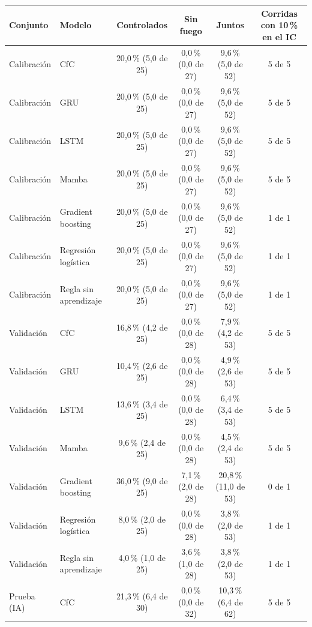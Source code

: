 \begin{tabular}{|l|l|c|c|c|c|}
\hline
\textbf{Conjunto} & \textbf{Modelo} & \textbf{Controlados} & \textbf{Sin fuego} & \textbf{Juntos} & \textbf{Corridas con 10\,\% en el IC} \\ \hline
Calibración & CfC & 20{,}0\,\% (5{,}0 de 25) & 0{,}0\,\% (0{,}0 de 27) & 9{,}6\,\% (5{,}0 de 52) & 5 de 5 \\ \hline
Calibración & GRU & 20{,}0\,\% (5{,}0 de 25) & 0{,}0\,\% (0{,}0 de 27) & 9{,}6\,\% (5{,}0 de 52) & 5 de 5 \\ \hline
Calibración & LSTM & 20{,}0\,\% (5{,}0 de 25) & 0{,}0\,\% (0{,}0 de 27) & 9{,}6\,\% (5{,}0 de 52) & 5 de 5 \\ \hline
Calibración & Mamba & 20{,}0\,\% (5{,}0 de 25) & 0{,}0\,\% (0{,}0 de 27) & 9{,}6\,\% (5{,}0 de 52) & 5 de 5 \\ \hline
Calibración & Gradient boosting & 20{,}0\,\% (5{,}0 de 25) & 0{,}0\,\% (0{,}0 de 27) & 9{,}6\,\% (5{,}0 de 52) & 1 de 1 \\ \hline
Calibración & Regresión logística & 20{,}0\,\% (5{,}0 de 25) & 0{,}0\,\% (0{,}0 de 27) & 9{,}6\,\% (5{,}0 de 52) & 1 de 1 \\ \hline
Calibración & Regla sin aprendizaje & 20{,}0\,\% (5{,}0 de 25) & 0{,}0\,\% (0{,}0 de 27) & 9{,}6\,\% (5{,}0 de 52) & 1 de 1 \\ \hline
Validación & CfC & 16{,}8\,\% (4{,}2 de 25) & 0{,}0\,\% (0{,}0 de 28) & 7{,}9\,\% (4{,}2 de 53) & 5 de 5 \\ \hline
Validación & GRU & 10{,}4\,\% (2{,}6 de 25) & 0{,}0\,\% (0{,}0 de 28) & 4{,}9\,\% (2{,}6 de 53) & 5 de 5 \\ \hline
Validación & LSTM & 13{,}6\,\% (3{,}4 de 25) & 0{,}0\,\% (0{,}0 de 28) & 6{,}4\,\% (3{,}4 de 53) & 5 de 5 \\ \hline
Validación & Mamba & 9{,}6\,\% (2{,}4 de 25) & 0{,}0\,\% (0{,}0 de 28) & 4{,}5\,\% (2{,}4 de 53) & 5 de 5 \\ \hline
Validación & Gradient boosting & 36{,}0\,\% (9{,}0 de 25) & 7{,}1\,\% (2{,}0 de 28) & 20{,}8\,\% (11{,}0 de 53) & 0 de 1 \\ \hline
Validación & Regresión logística & 8{,}0\,\% (2{,}0 de 25) & 0{,}0\,\% (0{,}0 de 28) & 3{,}8\,\% (2{,}0 de 53) & 1 de 1 \\ \hline
Validación & Regla sin aprendizaje & 4{,}0\,\% (1{,}0 de 25) & 3{,}6\,\% (1{,}0 de 28) & 3{,}8\,\% (2{,}0 de 53) & 1 de 1 \\ \hline
Prueba (IA) & CfC & 21{,}3\,\% (6{,}4 de 30) & 0{,}0\,\% (0{,}0 de 32) & 10{,}3\,\% (6{,}4 de 62) & 5 de 5 \\ \hline

\end{tabular}
